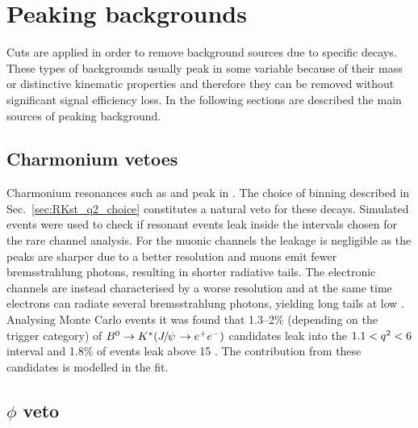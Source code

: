 \section{Peaking backgrounds }

Cuts are applied in order to remove background sources due to specific decays.
These types of backgrounds usually peak in some variable because of their mass
or distinctive kinematic properties and therefore they can be removed without significant
signal efficiency loss. In the following sections are described the main sources of peaking background.

\subsection{Charmonium vetoes}

Charmonium resonances such as \jpsi and \psitwos peak in \qsq.
The choice of \qsq binning described in Sec.~\ref{sec:RKst_q2_choice}
constitutes a natural veto for these decays. Simulated events were used
to check if resonant events leak inside the \qsq intervals chosen for
the rare channel analysis. For the muonic channels the leakage is negligible
as the peaks are sharper due to a better resolution and muons emit fewer
bremsstrahlung photons, resulting in shorter radiative tails.
The electronic channels are instead  characterised by
a worse resolution and at the same time electrons can radiate 
several bremsstrahlung photons, yielding long tails at low \qsq.
Analysing Monte Carlo events it was found that 1.3--2\% (depending on
the trigger category) of $\Bz\to\Kstar(\jpsi\to\ee)$ candidates leak into the $1.1 < {q^2} < 6$
\gevgevcccc interval and 1.8\% of \psitwos events leak above 15 \gevgevcccc.
The contribution from these candidates is modelled in the fit. 


\subsection{$\phi$ veto}

